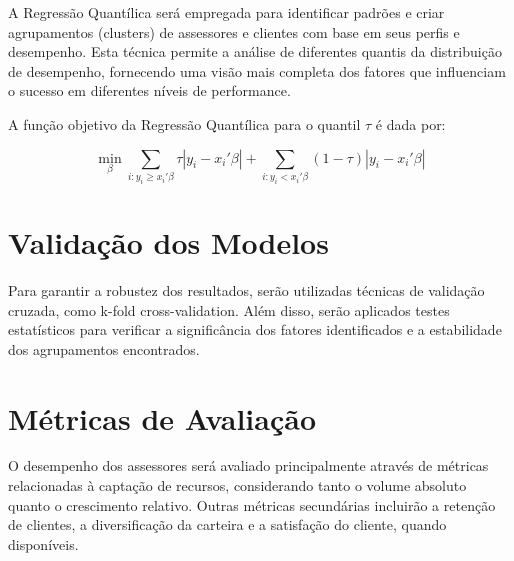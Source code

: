 A Regressão Quantílica será empregada para identificar padrões e criar agrupamentos (clusters) de assessores e clientes com base em seus perfis e desempenho. Esta técnica permite a análise de diferentes quantis da distribuição de desempenho, fornecendo uma visão mais completa dos fatores que influenciam o sucesso em diferentes níveis de performance.

A função objetivo da Regressão Quantílica para o quantil $\tau$ é dada por:

\begin{equation}
\min_{\beta} \sum_{i:y_i \geq x_i'\beta} \tau |y_i - x_i'\beta| + \sum_{i:y_i < x_i'\beta} (1-\tau) |y_i - x_i'\beta|
\end{equation}

\section{Validação dos Modelos}

Para garantir a robustez dos resultados, serão utilizadas técnicas de validação cruzada, como k-fold cross-validation. Além disso, serão aplicados testes estatísticos para verificar a significância dos fatores identificados e a estabilidade dos agrupamentos encontrados.

\section{Métricas de Avaliação}

O desempenho dos assessores será avaliado principalmente através de métricas relacionadas à captação de recursos, considerando tanto o volume absoluto quanto o crescimento relativo. Outras métricas secundárias incluirão a retenção de clientes, a diversificação da carteira e a satisfação do cliente, quando disponíveis.